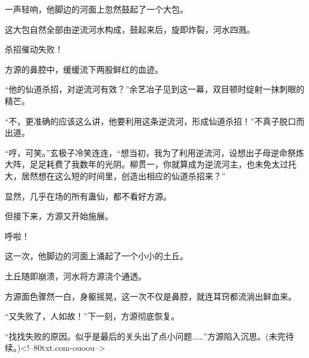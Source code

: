 \begin{this_body}
一声轻响，他脚边的河面上忽然鼓起了一个大包。

这大包自然全部由逆流河水构成，鼓起来后，旋即炸裂，河水四溅。

杀招催动失败！

方源的鼻腔中，缓缓流下两股鲜红的血迹。

“他的仙道杀招，对逆流河有效？”余艺冶子见到这一幕，双目顿时绽射一抹刺眼的精芒。

“不，更准确的应该这么讲，他要利用这条逆流河，形成仙道杀招！”不真子脱口而出道。

“哼，可笑。”玄极子冷笑连连，“想当初，我为了利用逆流河，设想出子母逆命祭炼大阵，足足耗费了我数年的光阴。柳贯一，你就算成为逆流河主，也未免太过托大，居然想在这么短的时间里，创造出相应的仙道杀招来？”

显然，几乎在场的所有蛊仙，都不看好方源。

但接下来，方源又开始施展。

呼啦！

这一次，他脚边的河面上涌起了一个小小的土丘。

土丘随即崩溃，河水将方源浇个通透。

方源面色骤然一白，身躯摇晃，这一次不仅是鼻腔，就连耳窍都流淌出鲜血来。

“又失败了，人如故！”下一刻，方源彻底恢复。

“找找失败的原因。似乎是最后的关头出了点小问题……”方源陷入沉思。(未完待续。)<!--80txt.com-ouoou-->

\end{this_body}

